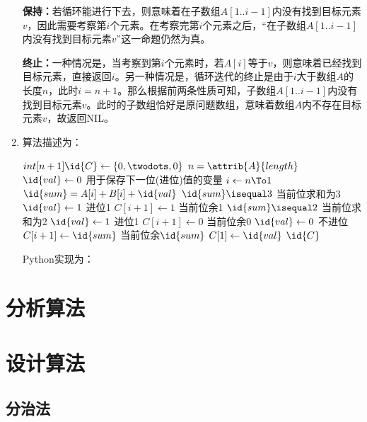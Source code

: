 \documentclass[UTF8,a4paper,zihao=-4,oneside,onecolumn,scheme=chinese,autoindent=true]{ctexbook}
\begin{document}
\begin{enumerate}
{          \textbf{保持：}若循环能进行下去，则意味着在子数组$A[1..i-1]$内没有找到目标元素$v$，因此需要考察第$i$个元素。在考察完第$i$个元素之后，“在子数组$A[1..i-1]$内没有找到目标元素$v$”这一命题仍然为真。

          \textbf{终止：}一种情况是，当考察到第$i$个元素时，若$A[i]$等于$v$，则意味着已经找到目标元素，直接返回$i$。另一种情况是，循环迭代的终止是由于$i$大于数组$A$的长度$n$，此时$i=n+1$。那么根据前两条性质可知，子数组$A[1..i-1]$内没有找到目标元素$v$。此时的子数组恰好是原问题数组，意味着数组$A$内不存在目标元素$v$，故返回NIL。
          }
    \item {
          算法描述为：
          \begin{codebox}
              \li $int[n+1] \id{C} \gets \{0,\twodots,0\}$ \RComment $n=\attrib{A}{length}$
              \li $\id{val} \gets 0$ \RComment 用于保存下一位(进位)值的变量
              \li \For $i \gets n \To 1$
              \li     \Do
              $\id{sum} = A[i]+B[i]+\id{val}$
              \li     \If $\id{sum} \isequal 3$ \Then \RComment 当前位求和为3
              \li         $\id{val} \gets 1$ \RComment 进位1
              \li         $C[i+1] \gets 1$ \RComment 当前位余1
              \li     \ElseIf $\id{sum} \isequal 2$ \Then \RComment 当前位求和为2
              \li         $\id{val} \gets 1$ \RComment 进位1
              \li         $C[i+1] \gets 0$ \RComment 当前位余0
              \li     \Else
              \li         $\id{val} \gets 0$ \RComment 不进位
              \li         $C[i+1] \gets \id{sum}$ \RComment 当前位余$\id{sum}$
              \End
              \End
              \li $C[1] \gets \id{val}$
              \li \Return $\id{C}$
          \end{codebox}

          Python实现为：

          }
\end{enumerate}

\section{分析算法}

\section{设计算法}
\subsection{分治法}
\end{document}
